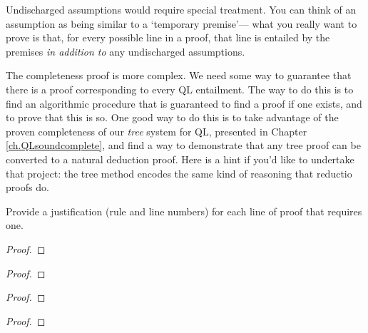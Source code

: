 Undischarged assumptions would require special treatment. You can think of an assumption as being similar to a `temporary premise'--- what you really want to prove is that, for every possible line in a proof, that line is entailed by the premises \emph{in addition to} any undischarged assumptions.

The completeness proof is more complex. We need some way to guarantee that there is a proof corresponding to every QL entailment. The way to do this is to find an algorithmic procedure that is guaranteed to find a proof if one exists, and to prove that this is so. One good way to do this is to take advantage of the proven completeness of our \emph{tree} system for QL, presented in Chapter \ref{ch.QLsoundcomplete}, and find a way to demonstrate that any tree proof can be converted to a natural deduction proof. Here is a hint if you'd like to undertake that project: the tree method encodes the same kind of reasoning that reductio proofs do.

\practiceproblems

\solutions
\problempart
\label{pr.justifyQLproof}
Provide a justification (rule and line numbers) for each line of proof that requires one.
\begin{multicols}{2}
\begin{proof}
	\open
	\close
{} {}
\end{proof}

\begin{proof}
 {}
 {}
\end{proof}


\begin{proof}
\open
\close
{}
\end{proof}


\begin{proof}
	\open
	\close
{} {}
\end{proof}
\end{multicols}

